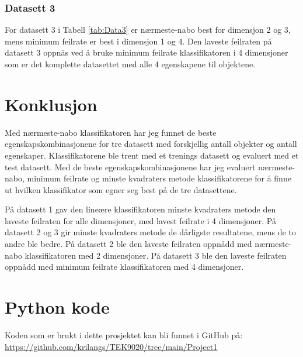 \documentclass[twocolumn,norwegian]{article}
\begin{document}
\subsubsection{Datasett 3}
For datasett 3 i Tabell \ref{tab:Data3} er nærmeste-nabo best for dimensjon 2 og 3, mens minimum feilrate er best i dimensjon 1 og 4. Den laveste feilraten på datasett 3 oppnås ved å bruke minimum feilrate klassifikatoren i 4 dimensjoner som er det komplette datasettet med alle 4 egenskapene til objektene.

\section{Konklusjon}
Med nærmeste-nabo klassifikatoren har jeg funnet de beste egenskapskombinasjonene for tre datasett med forskjellig antall objekter og antall egenskaper. Klassifikatorene ble trent med et trenings datasett og evaluert med et test datasett. Med de beste egenskapskombinasjonene har jeg evaluert nærmeste-nabo, minimum feilrate og minste kvadraters metode klassifikatorene for å finne ut hvilken klassifikator som egner seg best på de tre datasettene.

På datasett 1 gav den lineære klassifikatoren minste kvadraters metode den laveste feilraten for alle dimensjoner, med lavest feilrate i 4 dimensjoner. På datasett 2 og 3 gir minste kvadraters metode de dårligste resultatene, mens de to andre ble bedre. På datasett 2 ble den laveste feilraten oppnådd med nærmeste-nabo klassifikatoren med 2 dimensjoner. På datasett 3 ble den laveste feilraten oppnådd med minimum feilrate klassifikatoren med 4 dimensjoner.

\appendix
\section{Python kode}
\label{Appendix:Kode}
Koden som er brukt i dette prosjektet kan bli funnet i GitHub på: \url{https://github.com/krilangs/TEK9020/tree/main/Project1}
\end{document}
